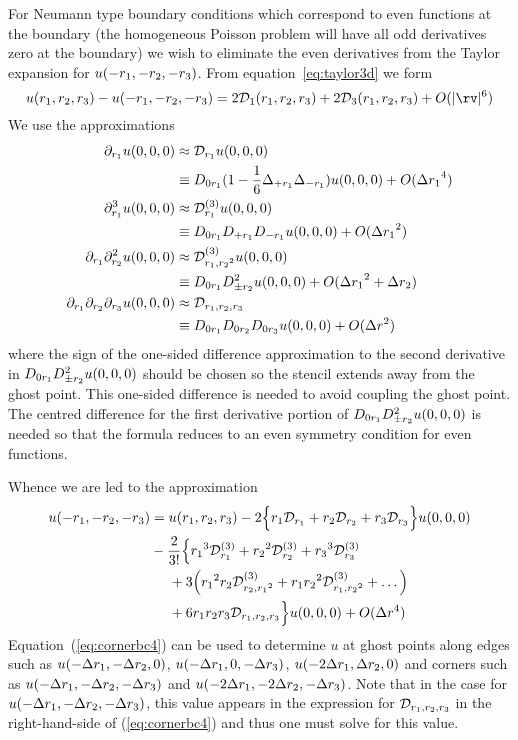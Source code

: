 For Neumann type boundary conditions which correspond to even functions at the boundary (the homogeneous
Poisson problem will have all odd derivatives zero at the boundary) we wish to eliminate the 
even derivatives from the Taylor expansion for $u(-{r_1},-{r_2},-{r_3})$. From equation~\ref{eq:taylor3d} we form
\[
 u(\ra,\rb,\rc)-u(-\ra,-\rb,-\rc)= 2\Ds_1(\ra,\rb,\rc)+2\Ds_3(\ra,\rb,\rc)+ \trunc
\]
We use the approximations
\begin{align*}
  \partial_{r_1} u(0,0,0) &\approx {\cal D}_{{r_1}} u(0,0,0) \\
                        &\equiv D_{0{r_1}}(1-{1\over 6} \Delta_{+{r_1}}\Delta_{-{r_1}}) u(0,0,0) + O({\Delta r_1}^4) \\
  \partial_{r_1}^3 u(0,0,0) &\approx {\cal D}_{{r_1}}^{(3)} u(0,0,0) \\
                        &\equiv  D_{0{r_1}}D_{+{r_1}}D_{-{r_1}} u(0,0,0) + O({\Delta r_1}^2) \\
  \partial_{r_1}\partial_{r_2}^2 u(0,0,0) &\approx {\cal D}_{{r_1},{r_2}^2}^{(3)} u(0,0,0)\\
                        &\equiv  D_{0{r_1}}D_{\pm{r_2}}^2 u(0,0,0) + O({\Delta r_1}^2+{\Delta r_2}) \\
  \partial_{r_1}\partial_{r_2}\partial_{r_3} u(0,0,0) &\approx {\cal D}_{{r_1},{r_2},{r_3}} \\
                        &\equiv D_{0{r_1}}D_{0{r_2}}D_{0{r_3}} u(0,0,0)+O(\Delta r^2)
\end{align*}
where the sign of the one-sided difference approximation to the second derivative in
$D_{0{r_1}}D_{\pm{r_2}}^2 u(0,0,0)$ should be chosen so the stencil extends away from the ghost point.
This one-sided difference is needed to avoid coupling the ghost point. The centred difference for
the first derivative portion of $D_{0{r_1}}D_{\pm{r_2}}^2 u(0,0,0)$ is needed so that the formula
reduces to an even symmetry condition for even functions.

Whence we are led to the approximation
\begin{align}
u(-{r_1},-{r_2},-{r_3})&= u({r_1},{r_2},{r_3}) - 2\Big\{ {r_1} {\cal D}_{{r_1}} + {r_2} {\cal D}_{{r_2}} + {r_3} {\cal D}_{{r_3}}\Big\} u(0,0,0) \nonumber \\
    &-  {2\over3!}\Big\{ {r_1}^3 {\cal D}_{{r_1}}^{(3)} + {r_2}^2 {\cal D}_{{r_2}}^{(3)} + {r_3}^3 {\cal D}_{{r_3}}^{(3)} \nonumber\\
    &~~~~          +3\Big( {r_1}^2{r_2} {\cal D}_{{r_2},{r_1}^2}^{(3)} + {r_1}{r_2}^2 {\cal D}_{{r_1},{r_2}^2}^{(3)} + \ldots \Big) \nonumber\\
    &~~~~   + 6 {r_1}{r_2}{r_3} {\cal D}_{{r_1},{r_2},{r_3}}
                  \Big\} u(0,0,0) + O(\Delta r^4) \label{eq:cornerbc4}
\end{align}
Equation~(\ref{eq:cornerbc4}) can be used to determine $u$ at ghost points along edges such as
$u(-{\Delta r_1},-{\Delta r_2},0)$, $u(-{\Delta r_1},0,-{\Delta r_3})$, $u(-2{\Delta r_1},{\Delta r_2},0)$ and corners such as $u(-{\Delta r_1},-{\Delta r_2},-{\Delta r_3})$ and
$u(-2{\Delta r_1},-2{\Delta r_2},-{\Delta r_3})$. Note that in the case for $u(-{\Delta r_1},-{\Delta r_2},-{\Delta r_3})$, this value appears 
in the expression for ${\cal D}_{{r_1},{r_2},{r_3}}$ in the right-hand-side
of (\ref{eq:cornerbc4}) and thus one must solve for this value.


